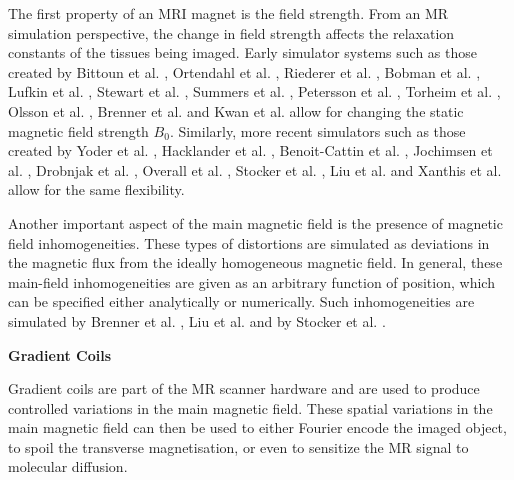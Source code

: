 The first property of an MRI magnet is the field strength. 
From an MR simulation perspective, the change in field strength affects the relaxation constants of the tissues being imaged.
Early simulator systems such as those created by
Bittoun et al. \cite{Bittoun1984},
Ortendahl et al. \cite{Ortendahl1984},
Riederer et al. \cite{Riederer1984},
Bobman et al. \cite{Bobman1985},
Lufkin et al. \cite{Lufkin1986},
Stewart et al. \cite{Stewart1986},
Summers et al. \cite{Summers1986},
Petersson et al. \cite{Petersson1993},
Torheim et al. \cite{Torheim1994}, 
Olsson et al. \cite{Olsson1995},
Brenner et al. \cite{Brenner1997} and
Kwan et al. \cite{Kwan1997} allow for changing the static magnetic field strength $B_0$.
Similarly, more recent simulators such as those created by
Yoder et al. \cite{Yoder2004},
Hacklander et al. \cite{Hacklander2005},
Benoit-Cattin et al. \cite{Benoit-Cattin2005},
Jochimsen et al. \cite{Jochimsen2004},
Drobnjak et al. \cite{Drobnjak2006},
Overall et al. \cite{Overall2007},
Stocker et al. \cite{Stocker2010},
Liu et al. \cite{Liu2013} and 
Xanthis et al. \cite{Xanthis2014} allow for the same flexibility.

\hfill

Another important aspect of the main magnetic field is the presence of magnetic field inhomogeneities.
These types of distortions are simulated as deviations in the magnetic flux from the ideally homogeneous magnetic field.
In general, these main-field inhomogeneities are given as an arbitrary function of position, which can be specified either analytically or numerically.
Such inhomogeneities are simulated by 
Brenner et al. \cite{Brenner1997}, 
Liu et al. \cite{Liu2013} and by
Stocker et al. \cite{Stocker2010}.

\hfill

\large \textbf{Gradient Coils} \normalsize

Gradient coils are part of the MR scanner hardware and are used to produce controlled variations in the main magnetic field.
These spatial variations in the main magnetic field can then be used 
to either Fourier encode the imaged object, 
to spoil the transverse magnetisation, or even
to sensitize the MR signal to molecular diffusion.

